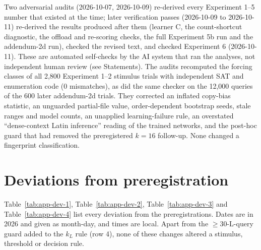 \documentclass[11pt]{article}
\begin{document}
Two adversarial audits (2026-10-07, 2026-10-09) re-derived every Experiment 1--5 number that existed at the time; later verification passes (2026-10-09 to 2026-10-11) re-derived the results produced after them (learner C, the count-shortcut diagnostic, the offload and re-scoring checks, the full Experiment 5b run and the addendum-2d run), checked the revised text, and checked Experiment 6 (2026-10-11). These are automated self-checks by the AI system that ran the analyses, not independent human review (see Statements). The audits recomputed the forcing classes of all 2,800 Experiment 1--2 stimulus trials with independent SAT and enumeration code (0 mismatches), as did the same checker on the 12,000 queries of the 600 later addendum-2d trials. They corrected an inflated copy-bias statistic, an unguarded partial-file value, order-dependent bootstrap seeds, stale ranges and model counts, an unapplied learning-failure rule, an overstated ``dense-context Latin inference'' reading of the trained networks, and the post-hoc guard that had removed the preregistered $k = 16$ follow-up. None changed a fingerprint classification.

\section{Deviations from preregistration}\label{app:deviations}

Table~\ref{tab:app-dev-1}, Table~\ref{tab:app-dev-2}, Table~\ref{tab:app-dev-3} and Table~\ref{tab:app-dev-4} list every deviation from the preregistrations. Dates are in 2026 and given as month-day, and times are local. Apart from the $\geq 30$-L-query guard added to the $k_L$ rule (row 4), none of these changes altered a stimulus, threshold or decision rule.
\end{document}
